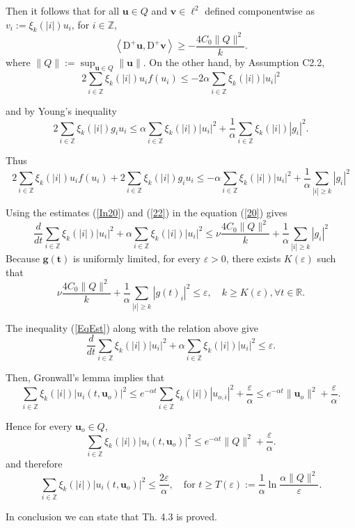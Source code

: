 \documentclass{amsart}%
\begin{document}
{Then it follows that for all \( \mathbf{u} \in Q \) and \( \mathbf{v} \in \ell^2 \) defined componentwise as \( v_i := \xi_k(|i|) u_i \), for \( i \in \mathbb{Z} \),
\begin{equation}\label{In20}
\left\langle \mathrm{D}^+ \mathbf{u}, \mathrm{D}^+ \mathbf{v} \right\rangle 
\ge - \frac{4 C_0 \|Q\|^2}{k}.
\end{equation}
where \( \|Q\| := \sup_{\mathbf{u} \in Q} \left\| \mathbf{u} \right\| \).
On the other hand, by Assumption C2.2,
\[
2 \sum_{i \in \mathbb{Z}} \xi_k(|i|) u_i f(u_i) \le -2 \alpha \sum_{i \in \mathbb{Z}} \xi_k(|i|) |u_i|^2
\]

and by Young's inequality
\[
2 \sum_{i \in \mathbb{Z}} \xi_k(|i|) g_i u_i \le \alpha \sum_{i \in \mathbb{Z}} \xi_k(|i|) |u_i|^2 + \frac{1}{\alpha} \sum_{i \in \mathbb{Z}} \xi_k(|i|) |g_i|^2.
\]

Thus
\begin{equation}\label{22}
2 \sum_{i \in \mathbb{Z}} \xi_k(|i|) u_i f(u_i) + 2 \sum_{i \in \mathbb{Z}} \xi_k(|i|) g_i u_i
\le -\alpha \sum_{i \in \mathbb{Z}} \xi_k(|i|) |u_i|^2 + \frac{1}{\alpha} \sum_{|i| \ge k} |g_i|^2
\end{equation}

Using the estimates (\ref{In20}) and (\ref{22}) in the equation (\ref{20}) gives
\begin{equation}\label{EqEst}
\frac{d}{dt} \sum_{i \in \mathbb{Z}} \xi_k(|i|) |u_i|^2 + \alpha \sum_{i \in \mathbb{Z}} \xi_k(|i|) |u_i|^2
\le \nu \frac{4 C_0 \| Q \|^2}{k} + \frac{1}{\alpha} \sum_{|i| \ge k} |g_i|^2
\end{equation}
Because \( \mathbf{g(t)}\) is uniformly limited, for every \( \varepsilon > 0 \), there exists \( K(\varepsilon) \) such that
\[
\nu \frac{4C_0 \|Q\|^2}{k} + \frac{1}{\alpha} \sum_{|i| \ge k} |g(t)_i|^2 \le \varepsilon, \quad k \ge K(\varepsilon), \forall t \in \mathbb{R}.
\]

The inequality (\ref{EqEst}) along with the relation above give
\[
\frac{d}{dt} \sum_{i \in \mathbb{Z}} \xi_k(|i|) |u_i|^2 + \alpha \sum_{i \in \mathbb{Z}} \xi_k(|i|) |u_i|^2 \le \varepsilon.
\]

Then, Gronwall's lemma implies that
\[
\sum_{i \in \mathbb{Z}} \xi_k(|i|) |u_i(t, \mathbf{u}_o)|^2 \le e^{-\alpha t} \sum_{i \in \mathbb{Z}} \xi_k(|i|) |u_{o, i}|^2 + \frac{\varepsilon}{\alpha}
\le e^{-\alpha t} \| \mathbf{u}_o \|^2 + \frac{\varepsilon}{\alpha}.
\]

Hence for every \( \mathbf{u}_o \in Q \),
\[
\sum_{i \in \mathbb{Z}} \xi_k(|i|) |u_i(t, \mathbf{u}_o)|^2 \le e^{-\alpha t} \| Q \|^2 + \frac{\varepsilon}{\alpha}.
\]
and therefore
\[
\sum_{i \in \mathbb{Z}} \xi_k(|i|) \left| u_i(t, \mathbf{u}_o) \right|^2 \le \frac{2\varepsilon}{\alpha}, \quad \text{for } t \ge T(\varepsilon) := \frac{1}{\alpha} \ln \frac{\alpha \| Q \|^2}{\varepsilon}.
\]
}
In conclusion we can state that Th. 4.3 is proved.
\end{document}
